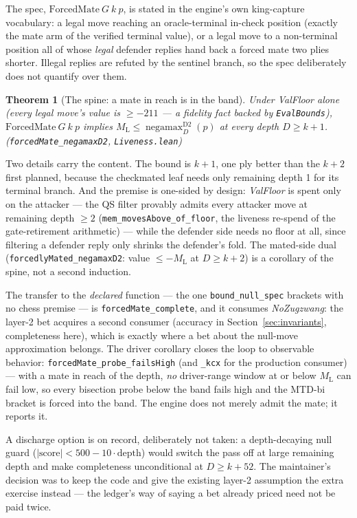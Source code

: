 \documentclass[11pt]{article}
\DeclareMathOperator{\negamax}{negamax}
\newcommand{\ML}{M_{\mathrm{L}}}    %
\newcommand{\leanref}[2]{(\texttt{#1}, \texttt{#2})}%
\theoremstyle{plain}
\newtheorem{theorem}{Theorem}[section]
\theoremstyle{definition}
\theoremstyle{remark}
\begin{document}
The spec, $\mathrm{ForcedMate}\ G\ k\ p$, is stated in the engine's
own king-capture vocabulary: a legal move reaching an oracle-terminal
in-check position (exactly the mate arm of the verified terminal
value), or a legal move to a non-terminal position all of whose
\emph{legal} defender replies hand back a forced mate two plies
shorter.  Illegal replies are refuted by the sentinel branch, so the
spec deliberately does not quantify over them.

\begin{theorem}[The spine: a mate in reach is in the band]
\label{thm:matek}
Under \emph{ValFloor} alone (every legal move's value is $\ge -211$
--- a fidelity fact backed by \texttt{EvalBounds}),
$\mathrm{ForcedMate}\ G\ k\ p$ implies
$\ML \le \negamax^{\mathrm{D2}}_D(p)$ at \emph{every} depth
$D \ge k + 1$.
\leanref{forcedMate\_negamaxD2}{Liveness.lean}
\end{theorem}

Two details carry the content.  The bound is $k+1$, one ply better
than the $k+2$ first planned, because the checkmated leaf needs only
remaining depth 1 for its terminal branch.  And the premise is
one-sided by design: \emph{ValFloor} is spent only on the attacker ---
the QS filter provably admits every attacker move at remaining depth
$\ge 2$ (\texttt{mem\_movesAbove\_of\_floor}, the liveness re-spend of
the gate-retirement arithmetic) --- while the defender side needs no
floor at all, since filtering a defender reply only shrinks the
defender's fold.  The mated-side dual
(\texttt{forcedlyMated\_negamaxD2}: value $\le -\ML$ at $D \ge k+2$)
is a corollary of the spine, not a second induction.

The transfer to the \emph{declared} function --- the one
\texttt{bound\_null\_spec} brackets with no chess premise --- is
\texttt{forcedMate\_complete}, and it consumes \emph{NoZugzwang}: the
layer-2 bet acquires a second consumer (accuracy in
Section~\ref{sec:invariants}, completeness here), which is exactly
where a bet about the null-move approximation belongs.  The driver
corollary closes the loop to observable behavior:
\texttt{forcedMate\_probe\_failsHigh} (and \texttt{\_kcx} for the
production consumer) --- with a mate in reach of the depth, \emph{no}
driver-range window at or below $\ML$ can fail low, so every bisection
probe below the band fails high and the MTD-bi bracket is forced into
the band.  The engine does not merely admit the mate; it reports it.

A discharge option is on record, deliberately not taken: a
depth-decaying null guard ($|\mathrm{score}| < 500 - 10 \cdot
\mathrm{depth}$) would switch the pass off at large remaining depth
and make completeness unconditional at $D \ge k + 52$.  The
maintainer's decision was to keep the code and give the existing
layer-2 assumption the extra exercise instead --- the ledger's way of
saying a bet already priced need not be paid twice.
\end{document}
